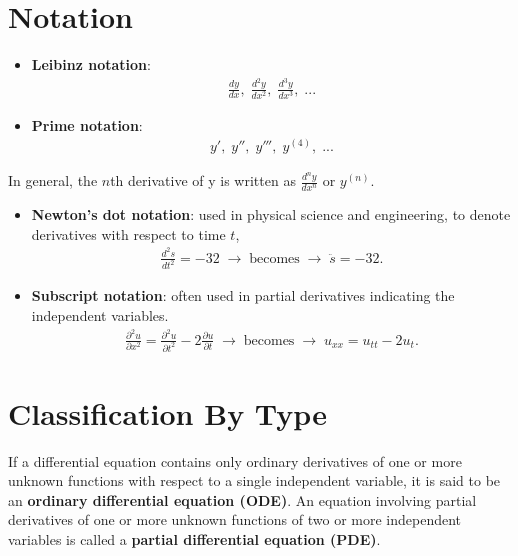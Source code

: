 \documentclass[12pt]{report}
\begin{document}
        \section{Notation}
        \begin{itemize}
            \item \textbf{Leibinz notation}:
            \begin{align*}
                \frac{dy}{dx}, \; \frac{d^{2}y}{dx^{2}}, \; \frac{d^{3}y}{dx^{3}}, \; ...
            \end{align*}
            \item \textbf{Prime notation}:
            \begin{align*}
                y', \; y'', \; y''', \; y^{(4)}, \; ...
            \end{align*}
        \end{itemize}
            In general, the $n$th derivative of y is written as $\frac{d^{n}y}{dx^{n}}$ or $y^{(n)}$.
        \begin{itemize}
            \item \textbf{Newton's dot notation}: used in physical science and engineering, to denote derivatives with respect to time $t$,
            \begin{align*}
                \frac{d^{2}s}{dt^{2}} = -32 \; \rightarrow \; \text{becomes} \; \rightarrow \; \ddot{s} = -32.
            \end{align*}
            \item \textbf{Subscript notation}: often used in partial derivatives indicating the independent variables.
            \begin{align*}
                \frac{\partial^{2} u}{\partial x^{2}} = \frac{\partial^{2} u}{\partial t^{2}} - 2 \frac{\partial u}{\partial t}\; \rightarrow \; \text{becomes} \; \rightarrow \; u_{xx} = u_{tt} - 2 u_{t}.
            \end{align*}
        \end{itemize}

        \section{Classification By Type}

        \par If a differential equation contains only ordinary derivatives of one or more unknown functions with respect to a single independent variable, it is said to be an \textbf{ordinary differential equation (ODE)}. An equation involving partial derivatives of one or more unknown functions of two or more independent variables is called a \textbf{partial differential equation (PDE)}.
\end{document}
